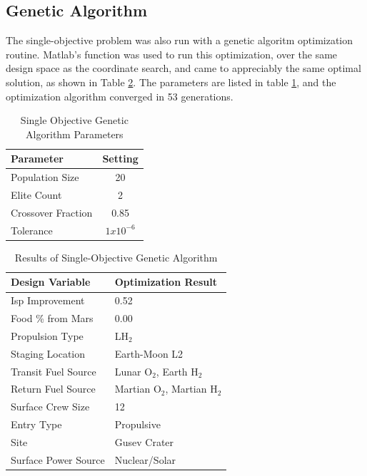 \documentclass[]{aiaa-pretty}
\begin{document}
\subsection{Genetic Algorithm}
\label{sec:gasingle}


The single-objective problem was also run with a genetic algoritm optimization routine. Matlab's  function was used to run this optimization, over the same design space as the coordinate search, and came to appreciably the same optimal solution, as shown in Table \ref{tab:GAsingle}. The  parameters are listed in table \ref{tab:gasingleparams}, and the optimization algorithm converged in 53 generations.

\begin{table}[h]
	\centering
	\caption{Single Objective Genetic Algorithm Parameters}
	\label{tab:gasingleparams}
	\begin{tabular}{lc}
		\textbf{Parameter} & \textbf{Setting} \\ \hline
		Population Size & 20\\
		Elite Count & 2\\
		Crossover Fraction & 0.85\\
		Tolerance & $1x10^{-6}$\\
	\end{tabular}
	\end{table}

\begin{table}[h!]
	\centering
	\caption{Results of Single-Objective Genetic Algorithm}
	\label{tab:GAsingle}
	\begin{tabular}{ll}
	\textbf{Design Variable} & \textbf{Optimization Result}\\ \hline
	Isp Improvement & 0.52 \\
	Food \% from Mars & 0.00 \\
	Propulsion Type & LH$_2$ \\
	Staging Location & Earth-Moon L2 \\
	Transit Fuel Source & Lunar O$_2$, Earth H$_2$ \\
	Return Fuel Source & Martian O$_2$, Martian H$_2$ \\
	Surface Crew Size & 12\\
	Entry Type & Propulsive \\
	Site & Gusev Crater \\
	Surface Power Source & Nuclear/Solar\\
	\end{tabular}
\end{table}
\end{document}
